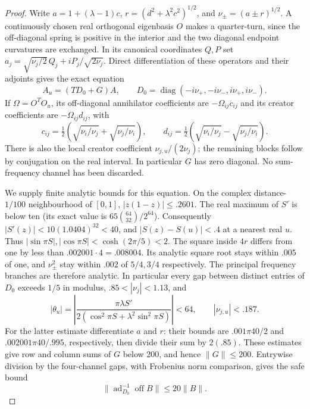 \documentclass[11pt]{article}
\numberwithin{equation}{section}
\theoremstyle{definition}
\theoremstyle{remark}
\begin{document}
\begin{proof}
Write $a=1+(\lambda-1)c$, $r=(d^2+\lambda^2c^2)^{1/2}$, and
$\nu_\pm=(a\pm r)^{1/2}$. A continuously chosen real orthogonal eigenbasis
$O$ makes a quarter-turn, since the off-diagonal spring is positive in the
interior and the two diagonal endpoint curvatures are exchanged. In its
canonical coordinates $Q,P$ set
$a_j=\sqrt{\nu_j/2}\,Q_j+iP_j/\sqrt{2\nu_j}$. Direct differentiation of
these operators and their adjoints gives the exact equation
\begin{equation}\label{p2s:eq:fourchannel}
 A_u=(TD_0+G)A,\qquad
 D_0=\operatorname{diag}(-i\nu_+,-i\nu_-,i\nu_+,i\nu_-).
\end{equation}
If $\Omega=O^TO_u$, its off-diagonal annihilator coefficients are
$-\Omega_{ij}c_{ij}$ and its creator coefficients are
$-\Omega_{ij}d_{ij}$, with
\[
 c_{ij}=\tfrac12(\sqrt{\nu_i/\nu_j}+\sqrt{\nu_j/\nu_i}),\qquad
 d_{ij}=\tfrac12(\sqrt{\nu_i/\nu_j}-\sqrt{\nu_j/\nu_i}).
\]
There is also the local creator coefficient $\nu_{j,u}/(2\nu_j)$;
the remaining blocks follow by conjugation on the real interval.
In particular $G$ has zero diagonal. No sum-frequency channel has been
discarded.

We supply finite analytic bounds for this equation. On the complex
distance-$1/100$ neighbourhood of $[0,1]$, $|z(1-z)|\leq.2601$.
The real maximum of $S'$ is below ten (its exact value is
$65\binom{64}{32}/2^{64}$). Consequently
$|S'(z)|<10(1.0404)^{32}<40$, and $|S(z)-S(u)|<.4$ at a nearest real $u$.
Thus $|\sin\pi S|,|\cos\pi S|<\cosh(2\pi/5)<2$.
The square inside $4r$ differs from one by less than
$.002001\cdot4=.008004$. Its analytic square root stays within $.005$ of
one, and $\nu_\pm^2$ stay within $.002$ of $5/4,3/4$ respectively.
The principal frequency branches are therefore analytic. In particular
every gap between distinct entries of $D_0$ exceeds $1/5$ in modulus,
$ .85<|\nu_j|<1.13$, and
\[
 |\theta_u|=\left|\frac{\pi\lambda S'}
 {2(\cos^2\pi S+\lambda^2\sin^2\pi S)}\right|<64,
 \qquad |\nu_{j,u}|<.187.
\]
For the latter estimate differentiate $a$ and $r$: their bounds are
$.001\pi40/2$ and $.002001\pi40/.995$, respectively, then divide their
sum by $2(.85)$. These estimates give row and column sums of $G$ below
200, and hence $\|G\|\leq200$. Entrywise division by the four-channel
gaps, with Frobenius norm comparison, gives the safe bound
\begin{equation}\label{p2s:eq:homological}
 \|\operatorname{ad}_{D_0}^{-1}\operatorname{off}B\|
 \leq20\|B\|.
\end{equation}


\end{proof}
\end{document}

